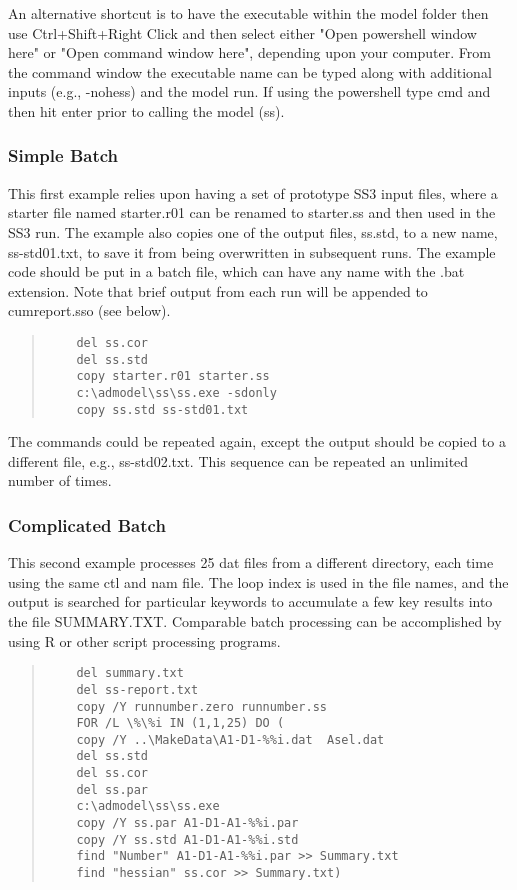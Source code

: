 An alternative shortcut is to have the executable within the model folder then use Ctrl+Shift+Right Click and then select either "Open powershell window here" or "Open command window here", depending upon your computer.  From the command window the executable name can be typed along with additional inputs (e.g., -nohess) and the model run.  If using the powershell type cmd and then hit enter prior to calling the model (ss). 


\subsubsection{Simple Batch}

This first example relies upon having a set of prototype SS3 input files, where a starter file named starter.r01 can be renamed to starter.ss and then used in the SS3 run. The example also copies one of the output files, ss.std, to a new name, ss-std01.txt, to save it from being overwritten in subsequent runs. The example code should be put in a batch file, which can have any name with the .bat extension. Note that brief output from each run will be appended to cumreport.sso (see below).

\begin{quote}
	\begin{verbatim}
	del ss.cor
	del ss.std
	copy starter.r01 starter.ss
	c:\admodel\ss\ss.exe -sdonly
	copy ss.std ss-std01.txt
	\end{verbatim}
\end{quote}

The commands could be repeated again, except the output should be copied to a different file, e.g., ss-std02.txt. This sequence can be repeated an unlimited number of times.

\subsubsection{Complicated Batch}
This second example processes 25 dat files from a different directory, each time using the same ctl and nam file.  The loop index is used in the file names, and the output is searched for particular keywords to accumulate a few key results into the file SUMMARY.TXT.  Comparable batch processing can be accomplished by using R or other script processing programs.

\begin{quote}
	\begin{verbatim}
	del summary.txt
	del ss-report.txt
	copy /Y runnumber.zero runnumber.ss
	FOR /L \%\%i IN (1,1,25) DO (
	copy /Y ..\MakeData\A1-D1-%%i.dat  Asel.dat
	del ss.std
	del ss.cor
	del ss.par
	c:\admodel\ss\ss.exe
	copy /Y ss.par A1-D1-A1-%%i.par
	copy /Y ss.std A1-D1-A1-%%i.std
	find "Number" A1-D1-A1-%%i.par >> Summary.txt
	find "hessian" ss.cor >> Summary.txt)
	\end{verbatim}
\end{quote}


